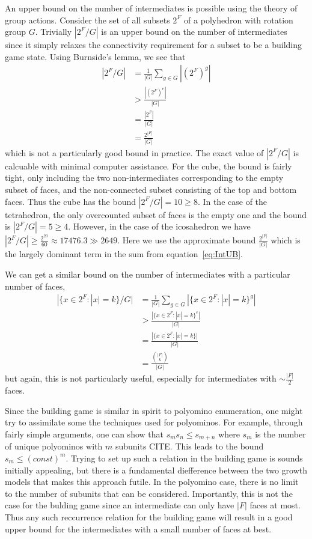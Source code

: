 An upper bound on the number of intermediates is possible using the theory of group actions. Consider the set of all subsets $2^F$ of a polyhedron with rotation group $G$. Trivially $|2^F/G|$ is an upper bound on the number of intermediates since it simply relaxes the connectivity requirement for a subset to be a building game state. Using Burnside's lemma, we see that 
\begin{align}
  \label{eq:IntUB}
  |2^F/G| &= \frac{1}{|G|}\sum_{g \in G}|(2^F)^g| \\
  &> \frac{|(2^F)^e|}{|G|} \\
  &= \frac{|2^F|}{|G|} \\
  &= \frac{2^{|F|}}{|G|}
\end{align}
which is not a particularly good bound in practice. The exact value of $|2^F/G|$ is calcuable with minimal computer assistance. For the cube, the bound is fairly tight, only including the two non-intermediates corresponding to the empty subset of faces, and the non-connected subset consisting of the top and bottom faces. Thus the cube has the bound $|2^F/G| = 10 \geq 8$. In the case of the tetrahedron, the only overcounted subset of faces is the empty one and the bound is $|2^F/G| = 5 \geq 4$. However, in the case of the icosahedron we have $|2^F/G| \geq \frac{2^{20}}{60} \approx 17476.3 \gg 2649$. Here we use the approximate bound $\frac{2^{|F|}}{|G|}$ which is the largely dominant term in the sum from equation~\ref{eq:IntUB}.

We can get a similar bound on the number of intermediates with a particular number of faces,
\begin{align}
  |\{x \in 2^F: |x| = k\} /G| &= \frac{1}{|G|}\sum_{g \in G}|\{x \in 2^F: |x| = k\}^g| \\
  &> \frac{|\{x \in 2^F: |x| = k\}^e|}{|G|} \\
  &= \frac{|\{x \in 2^F: |x| = k\}|}{|G|} \\
  &= \frac{{|F| \choose k}}{|G|}
\end{align}
but again, this is not particularly useful, especially for intermediates with $\sim\frac{|F|}{2}$ faces.

Since the building game is similar in spirit to polyomino enumeration, one might try to assimilate some the techniques used for polyominos. For example, through fairly simple arguments, one can show that $s_ms_n \leq s_{m+n}$ where $s_m$ is the number of unique polyominos with $m$ subunits CITE. This leads to the bound $s_m \leq (const)^m$. Trying to set up such a relation in the building game is sounds initially appealing, but there is a fundamental diefference between the two growth models that makes this approach futile. In the polyomino case, there is no limit to the number of subunits that can be considered. Importantly, this is not the case for the bulding game since an intermediate can only have $|F|$ faces at most. Thus any such reccurrence relation for the building game will result in a good upper bound for the intermediates with a small number of faces at best.

